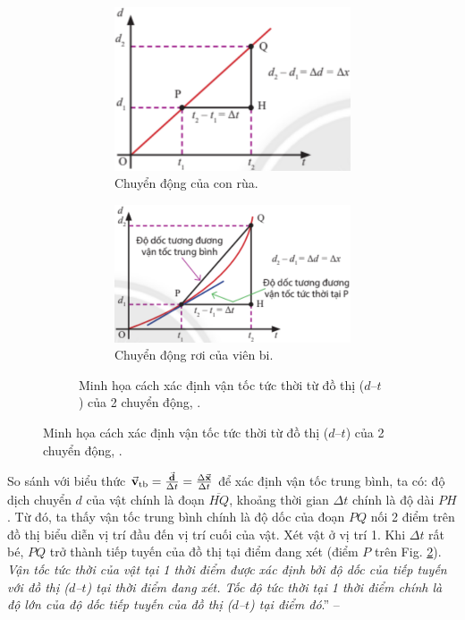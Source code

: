 \documentclass[oneside]{book}
\numberwithin{equation}{section}
\begin{document}
\begin{figure}[H]
	\begin{figure}[H]
		\centering
		\begin{subfigure}{.5\textwidth}
			\centering
			\includegraphics[width=.5\linewidth]{chuyen_dong_cua_con_rua}
			\caption{Chuyển động của con rùa.}
		\end{subfigure}%
		\begin{subfigure}{.5\textwidth}
			\centering
			\includegraphics[width=.6\linewidth]{chuyen_dong_roi_cua_vien_bi}
			\caption{Chuyển động rơi của viên bi.}
		\end{subfigure}
		\caption{Minh họa cách xác định vận tốc tức thời từ đồ thị ($d$--$t$) của 2 chuyển động, \cite[Hình 4.10, p. 29]{SGK_Vat_Ly_10_Chan_Troi_Sang_Tao}.}
		\label{fig:chuyen_dong_cua_con_rua_vien_bi}
	\end{figure}
\end{figure}
So sánh với biểu thức $\vec{\bf v}_{\rm tb} = \frac{\vec{\bf d}}{\Delta t} = \frac{\Delta\vec{\bf x}}{\Delta t}$ để xác định vận tốc trung bình, ta có: độ dịch chuyển $d$ của vật chính là đoạn $\overline{HQ}$, khoảng thời gian $\Delta t$ chính là độ dài $PH$. Từ đó, ta thấy vận tốc trung bình chính là độ dốc của đoạn $PQ$ nối 2 điểm trên đồ thị biểu diễn vị trí đầu đến vị trí cuối của vật. Xét vật ở vị trí 1. Khi $\Delta t$ rất bé, $PQ$ trở thành tiếp tuyến của đồ thị tại điểm đang xét (điểm $P$ trên Fig. \ref{fig:chuyen_dong_cua_con_rua_vien_bi}). \textit{Vận tốc tức thời của vật tại 1 thời điểm được xác định bởi độ dốc của tiếp tuyến với đồ thị ($d$--$t$) tại thời điểm đang xét. Tốc độ tức thời tại 1 thời điểm chính là độ lớn của độ dốc tiếp tuyến của đồ thị ($d$--$t$) tại điểm đó}.'' -- \cite[p. 29]{SGK_Vat_Ly_10_Chan_Troi_Sang_Tao}
\end{document}
